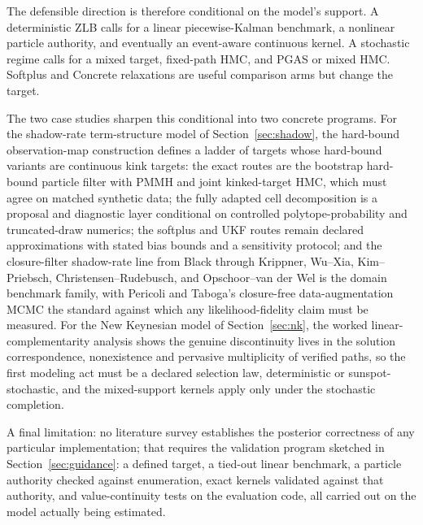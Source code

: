 \documentclass[11pt]{article}
\begin{document}
The defensible direction is therefore conditional on the model's support. A
deterministic ZLB calls for a linear piecewise-Kalman benchmark, a nonlinear
particle authority, and eventually an event-aware continuous kernel. A
stochastic regime calls for a mixed target, fixed-path HMC, and PGAS or mixed
HMC. Softplus and Concrete relaxations are useful comparison arms but change
the target.

The two case studies sharpen this conditional into two concrete programs. For
the shadow-rate term-structure model of Section~\ref{sec:shadow}, the hard-bound
observation-map construction defines a ladder of targets whose hard-bound
variants are continuous kink targets: the exact routes are the bootstrap
hard-bound particle filter with PMMH and joint kinked-target HMC, which must
agree on matched synthetic data; the fully adapted cell decomposition is a
proposal and diagnostic layer conditional on controlled polytope-probability
and truncated-draw numerics; the softplus and UKF routes remain declared
approximations with stated bias bounds and a sensitivity protocol; and the
closure-filter shadow-rate line from Black through Krippner, Wu--Xia,
Kim--Priebsch, Christensen--Rudebusch, and Opschoor--van der Wel is the domain
benchmark family, with Pericoli and Taboga's closure-free data-augmentation
MCMC the standard against which any likelihood-fidelity claim must be
measured. For the New Keynesian model of Section~\ref{sec:nk}, the worked
linear-complementarity analysis shows the genuine discontinuity lives in the
solution correspondence, nonexistence and pervasive multiplicity of
verified paths, so the first modeling act must be a declared selection law,
deterministic or sunspot-stochastic, and the mixed-support kernels apply only
under the stochastic completion.

A final limitation: no literature survey
establishes the posterior correctness of any particular implementation; that
requires the validation program sketched in Section~\ref{sec:guidance}: a defined
target, a tied-out linear benchmark, a particle authority checked against
enumeration, exact kernels validated against that authority, and
value-continuity tests on the evaluation code, all carried out on the model
actually being estimated.
\end{document}

